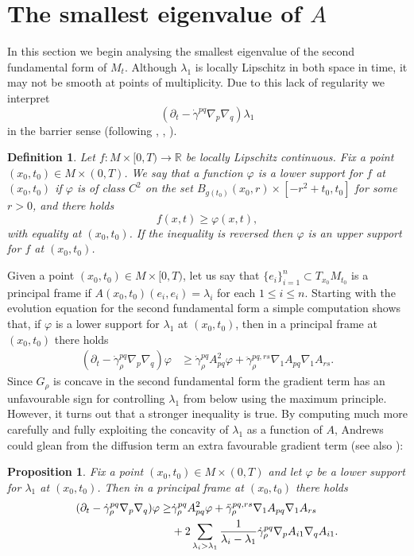 \documentclass[12pt]{amsart}
\newtheorem{proposition}[theorem]{Proposition}
\newtheorem{definition}[theorem]{Definition}
\begin{document}
\section{The smallest eigenvalue of $A$}
\label{sec:smallest_eig}

In this section we begin analysing the smallest eigenvalue of the second fundamental form of $M_t$. Although $\lambda_1$ is locally Lipschitz in both space in time, it may not be smooth at points of multiplicity. Due to this lack of regularity we interpret 
\[(\partial_t - \dot \gamma^{pq} \nabla_p \nabla_q )\lambda_1\]
in the barrier sense (following \cite{ALM14}, \cite{Brendle15}, \cite{Lang17}). 

\begin{definition}
Let $f:M\times [0,T) \to \mathbb{R}$ be locally Lipschitz continuous. Fix a point $(x_0,t_0) \in M \times (0,T)$. We say that a function $\varphi$ is a lower support for $f$ at $(x_0,t_0)$ if $\varphi$ is of class $C^2$ on the set $B_{g(t_0)}(x_0,r) \times [-r^2 +t_0,t_0]$ for some $r >0$, and there holds
\[f(x,t) \geq \varphi(x,t),\]
with equality at $(x_0,t_0)$. If the inequality is reversed then $\varphi$ is an upper support for $f$ at $(x_0,t_0)$. 
\end{definition}

Given a point $(x_0,t_0) \in M\times [0,T)$, let us say that $\{e_i\}_{i=1}^n \subset T_{x_0} M_{t_0}$ is a principal frame if $A(x_0,t_0)(e_i,e_i) = \lambda_i$ for each $1 \leq i \leq n$. Starting with the evolution equation for the second fundamental form a simple computation shows that, if $\varphi$ is a lower support for $\lambda_1$ at $(x_0,t_0)$, then in a principal frame at $(x_0,t_0)$ there holds 
\begin{align*}
(\partial_t - \dot \gamma_\rho^{pq} \nabla_p \nabla_q) \varphi &\geq \dot \gamma_\rho^{pq}  A^2_{pq} \varphi  + \ddot \gamma_\rho^{pq,rs} \nabla_1 A_{pq} \nabla_1 A_{rs}.
\end{align*}
Since $G_\rho$ is concave in the second fundamental form the gradient term has an unfavourable sign for controlling $\lambda_1$ from below using the maximum principle. However, it turns out that a stronger inequality is true. By computing much more carefully and fully exploiting the concavity of $\lambda_1$ as a function of $A$, Andrews could glean from the diffusion term an extra favourable gradient term \cite{And07} (see also \cite{Lang17}):

\begin{proposition}
\label{prop:lambda_1_evol}
Fix a point $(x_0,t_0) \in M\times (0,T)$ and let $\varphi$ be a lower support for $\lambda_1$ at $(x_0,t_0)$. Then in a principal frame at $(x_0,t_0)$ there holds 
\begin{align}
\label{eq:lambda_1_evol}
(\partial_t - \dot \gamma_\rho^{pq} \nabla_p \nabla_q) \varphi \geq& \dot \gamma_\rho^{pq}  A^2_{pq} \varphi  + \ddot \gamma_\rho^{pq,rs} \nabla_1 A_{pq} \nabla_1 A_{rs}\notag\\
&+ 2\sum_{\lambda_i > \lambda_1 }  \frac{1}{\lambda_i - \lambda_1} \dot \gamma_\rho^{pq}  \nabla_p A_{i1} \nabla_q A_{i1}.
\end{align}
\end{proposition}
\end{document}
